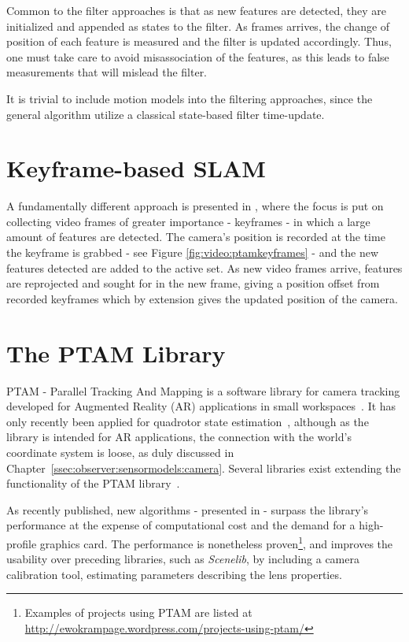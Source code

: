         Common to the filter approaches is that as new features are detected,
        they are initialized and appended as states to the filter.
        As frames arrives, the change of position of each feature is measured and
        the filter is updated accordingly.
        Thus, one must take care to avoid misassociation of the features, as
        this leads to false measurements that will mislead the filter.

        It is trivial to include motion models into the filtering approaches, since
        the general algorithm utilize a classical state-based filter time-update.

    \section{Keyframe-based SLAM}
        A fundamentally different approach is presented in \citep{klein07parallel},
        where the focus is put on collecting video frames of greater importance - keyframes -
        in which a large amount of features are detected.
        The camera's position is recorded at the time the keyframe is grabbed - see Figure \ref{fig:video:ptamkeyframes} -
        and the new features detected are added to the active set.
        As new video frames arrive, features are reprojected and sought for in
        the new frame, giving a position offset from recorded keyframes which by
        extension gives the updated position of the camera.


    \section{The PTAM Library}
        PTAM - Parallel Tracking And Mapping is a software library for camera tracking
        developed for Augmented Reality (AR) applications in small workspaces~\citep{klein07parallel}.
        It has only recently been applied for quadrotor state estimation~\citep{weiss11monocular},
        although as the library is intended for AR applications, the connection
        with the world's coordinate system is loose, as duly discussed in Chapter~\ref{ssec:observer:sensormodels:camera}.
        Several libraries exist extending the functionality of the PTAM library~\citep{Nguyen_Sandor_Park_2010}.

        As recently published, new algorithms - presented in \citep{Newcombe2011} - surpass
        the library's performance at the expense of computational cost
        and the demand for a high-profile graphics card.
        The performance is nonetheless proven\footnote{Examples of projects using PTAM are listed at \url{http://ewokrampage.wordpress.com/projects-using-ptam/}},
        and improves the usability over preceding libraries, such as \textit{Scenelib}, by including
        a camera calibration tool, estimating parameters describing the lens properties.

